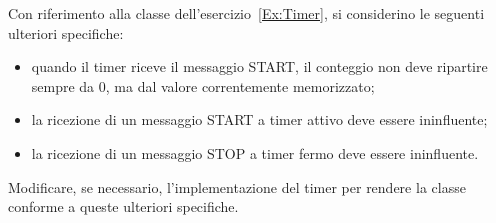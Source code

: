 Con riferimento alla classe  dell'esercizio~\ref{Ex:Timer}, si considerino le seguenti ulteriori specifiche:

\begin{itemize}
\item quando il timer riceve il messaggio START, il conteggio non deve ripartire sempre da $0$, ma dal valore correntemente memorizzato;
\item la ricezione di un messaggio START a timer attivo deve essere ininfluente;
\item la ricezione di un messaggio STOP a timer fermo deve essere ininfluente.
\end{itemize}

Modificare, se necessario, l'implementazione del timer per rendere la classe conforme a queste ulteriori specifiche.